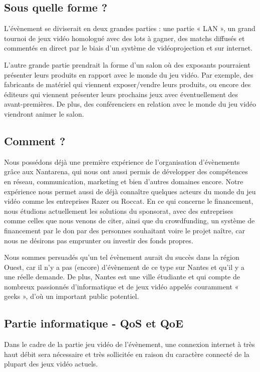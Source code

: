 \documentclass[french]{article}
\begin{document}
\subsection{Sous quelle forme ?}

L'évènement se diviserait en deux grandes parties : une partie « LAN », un grand tournoi de jeux vidéo homologué avec des lots à gagner, des matchs diffusés et commentés en direct par le biais d'un système de vidéoprojection et sur internet.

L'autre grande partie prendrait la forme d'un salon où des exposants pourraient présenter leurs produits en rapport avec le monde du jeu vidéo. Par exemple, des fabricants de matériel qui viennent exposer/vendre leurs produits, ou encore des éditeurs qui viennent présenter leurs prochains jeux avec éventuellement des avant-premières. De plus, des conférenciers en relation avec le monde du jeu vidéo viendront animer le salon.

\subsection{Comment ?}

Nous possédons déjà une première expérience de l'organisation d'évènements grâce aux Nantarena, qui nous ont aussi permis de développer des compétences en réseau, communication, marketing et bien d'autres domaines encore.
Notre expérience nous permet aussi de  déjà connaître quelques acteurs du monde du jeu vidéo comme les entreprises Razer ou Roccat.
En ce qui concerne le financement, nous étudions actuellement les solutions du sponsorat, avec des entreprises comme celles que nous venons de citer, ainsi que du crowdfunding, un système de financement par le don par des personnes souhaitant voire le projet naître, car nous ne désirons pas emprunter ou investir des fonds propres.

Nous sommes persuadés qu'un tel évènement aurait du succès dans la région Ouest, car il n'y a pas (encore) d'évènement de ce type sur Nantes et qu'il y a une réelle demande. De plus, Nantes est une ville étudiante et qui compte de nombreux passionnés d'informatique et de jeux vidéo appelés couramment « geeks », d'où un important public potentiel.

\subsection{Partie informatique - QoS et QoE}

Dans le cadre de la partie jeu vidéo de l'évènement, une connexion internet à très haut débit sera nécessaire et très sollicitée en raison du caractère connecté de la plupart des jeux vidéo actuels.
\end{document}
